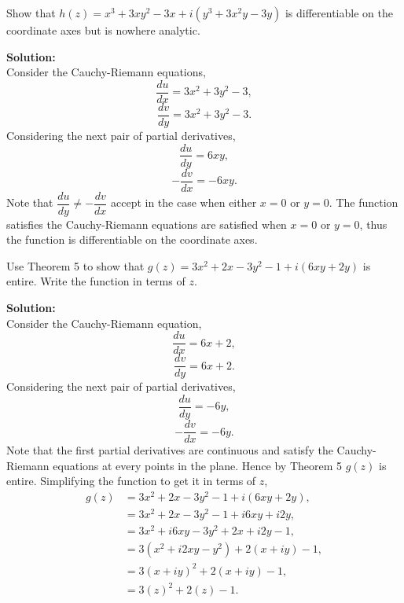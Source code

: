 \documentclass[12pt]{article}
\makeatletter
\theoremstyle{homework}
\newenvironment{exercise}[1]
{\def\@currentlabel{#1}\exercisecore}
{\endexercisecore}
\newcommand{\localhead}[1]{\par\smallskip\noindent\textbf{#1}\nobreak\\}%
\newcommand\solution{\localhead{Solution:}}
\makeatother
\begin{document}
\begin{exercise}{2} Show that $h(z) = x^3 + 3xy^2 - 3x + i(y^3 + 3x^2y - 3y)$ is differentiable on the coordinate axes but 
  is nowhere analytic. \\
  \solution Consider the Cauchy-Riemann equations,  
  \begin{equation*}
    \dfrac{du}{dx} = 3x^2 + 3y^2 - 3,
  \end{equation*}
  \begin{equation*}
    \dfrac{dv}{dy} = 3x^2 + 3y^2 - 3.
  \end{equation*}
  Considering the next pair of partial derivatives, 
  \begin{equation*}
    \dfrac{du}{dy} = 6xy,
  \end{equation*}
  \begin{equation*}
    -\dfrac{dv}{dx} = -6xy.
  \end{equation*}
  Note that $\dfrac{du}{dy} \neq -\dfrac{dv}{dx}$ accept in the case when either $x = 0$ or $y = 0$.  
  The function satisfies the Cauchy-Riemann equations are satisfied when $x = 0$ or $y = 0$, thus the function is differentiable on the coordinate axes.

\end{exercise}
\vspace{.5in}




\begin{exercise}{3}Use Theorem 5 to show that $g(z) = 3x^2 + 2x - 3y^2 - 1 + i(6xy + 2y)$ is entire. Write the 
  function in terms of $z$.\\
  \solution Consider the Cauchy-Riemann equation,
  \begin{equation*}
    \dfrac{du}{dx} =  6x + 2,
  \end{equation*}
  \begin{equation*}
    \dfrac{dv}{dy} = 6x + 2.
  \end{equation*}
  Considering the next pair of partial derivatives, 
  \begin{equation*}
    \dfrac{du}{dy} = -6y,
  \end{equation*}
  \begin{equation*}
    -\dfrac{dv}{dx} = -6y.
  \end{equation*}
  Note that the first partial derivatives are continuous and satisfy the Cauchy-Riemann equations at every points in the plane. 
  Hence by Theorem 5 $g(z)$ is entire. Simplifying the function to get it in terms of $z$, 
  \begin{align*}
    g(z) &= 3x^2 + 2x - 3y^2 - 1 + i(6xy + 2y),\\
    &= 3x^2 + 2x - 3y^2 - 1 + i6xy + i2y,\\
    &= 3x^2 + i6xy - 3y^2 + 2x + i2y - 1,\\
    &= 3(x^2 + i2xy - y^2) + 2(x + iy) - 1,\\
    &= 3(x + iy)^2 + 2(x + iy) - 1, \\
    &= 3(z)^2 + 2(z) - 1. 
  \end{align*}
\end{exercise}
\vspace{.5in}
\end{document}
